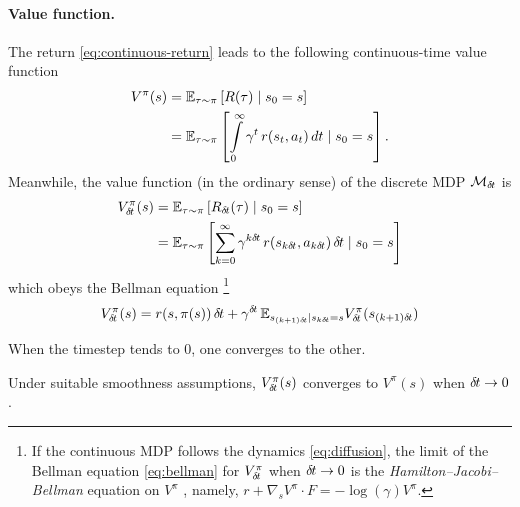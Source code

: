 \paragraph{Value function.}
The return \eqref{eq:continuous-return} leads to the
following continuous-time value function
\begin{align}
  V^\pi(s) &= \mathbb{E}_{\tau\sim\pi}\left[R(\tau) \mid s_0 = s\right]\\
  &= \mathbb{E}_{\tau\sim\pi}\left[\int\limits_{0}^\infty \gamma^{t}\, r(s_t,
  a_t) \,dt \mid s_0 = s\right].
\end{align}
Meanwhile, the value function (in the ordinary sense) of the discrete MDP ${\cal
M}_{\delta\hspace{-.1em}t}$ is
\begin{align}
  V^\pi_{\delta\hspace{-.1em}t}(s) &= \mathbb{E}_{\tau\sim\pi}\left[R_{\delta\hspace{-.1em}t}(\tau) \mid s_0 = s\right]\\
  &= \mathbb{E}_{\tau\sim\pi}\left[\sum\limits_{k=0}^\infty
  \gamma^{k{\delta\hspace{-.1em}t}}\,r(s_{k{\delta\hspace{-.1em}t}}, a_{k{\delta\hspace{-.1em}t}})\,{\delta\hspace{-.1em}t} \mid s_0 = s\right]
\end{align}
which obeys the Bellman equation
\footnote{
If the continuous MDP follows the dynamics \eqref{eq:diffusion}, the limit of
the Bellman equation \eqref{eq:bellman} for $V^\pi_{\delta\hspace{-.1em}t}$ when ${\delta\hspace{-.1em}t} \rightarrow 0$ is
the \emph{Hamilton--Jacobi--Bellman} equation on $V^\pi$ \cite{cont_rl},
namely,
  $r + \nabla_s V^\pi \cdot F = - \log(\gamma) V^\pi$.
}
\begin{equation}
  \label{eq:bellman}
  V^\pi_{\delta\hspace{-.1em}t}(s) = {r}(s, \pi(s))\,{\delta\hspace{-.1em}t} + \gamma^{{\delta\hspace{-.1em}t}}\,
  \mathbb{E}_{s_{(k+1){\delta\hspace{-.1em}t}} | s_{k{\delta\hspace{-.1em}t}} = s} V^\pi_{\delta\hspace{-.1em}t}(s_{(k+1){\delta\hspace{-.1em}t}})
\end{equation}

When the timestep tends to $0$, one converges to the other.
  \begin{theorem}
    \label{th:conv-value}
Under suitable smoothness assumptions, $V^\pi_{\delta\hspace{-.1em}t}(s)$ converges to
$V^\pi(s)$ when ${\delta\hspace{-.1em}t}\to 0$.
   \end{theorem}

